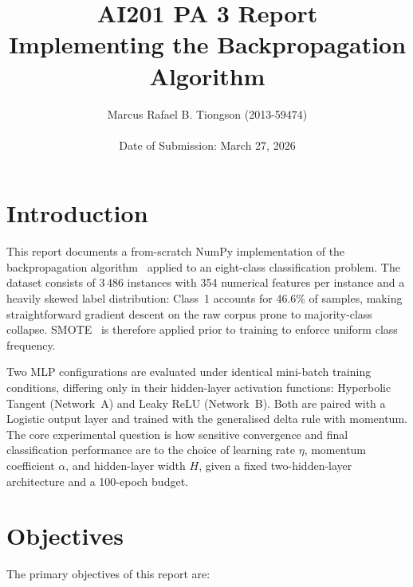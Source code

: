 \documentclass{acm_proc_article-sp}
\begin{document}
\title{AI201 PA 3 Report\\Implementing the Backpropagation Algorithm}

\author{
\alignauthor Marcus Rafael B. Tiongson (2013-59474)\\ %
~\\
Date of Submission: March 27, 2026
}

\maketitle

\section{Introduction}


This report documents a from-scratch NumPy implementation of the
backpropagation algorithm~\cite{rumelhart1986} applied to an eight-class
classification problem.  The dataset consists of 3\,486 instances with
354 numerical features per instance and a heavily skewed label
distribution: Class~1 accounts for 46.6\% of samples, making
straightforward gradient descent on the raw corpus prone to majority-class
collapse.  SMOTE~\cite{chawla2002,brownlee2021} is therefore applied
prior to training to enforce uniform class frequency.

Two MLP configurations are evaluated under identical mini-batch training
conditions, differing only in their hidden-layer activation functions:
Hyperbolic Tangent (Network~A) and Leaky ReLU (Network~B).  Both are
paired with a Logistic output layer and trained with the generalised delta
rule with momentum.  The core experimental question is how sensitive
convergence and final classification performance are to the choice of
learning rate $\eta$, momentum coefficient $\alpha$, and hidden-layer
width $H$, given a fixed two-hidden-layer architecture and a 100-epoch
budget.

\section{Objectives}

The primary objectives of this report are:
\end{document}

